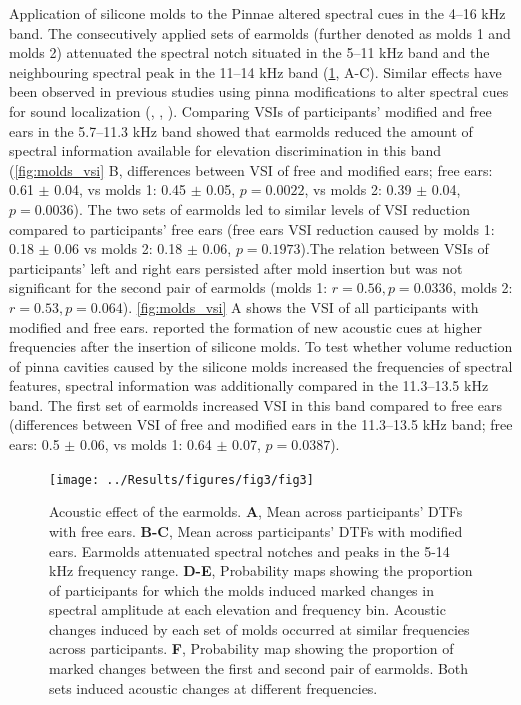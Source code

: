 Application of silicone molds to the Pinnae altered spectral cues in the 4–16 kHz band. The consecutively applied sets of earmolds (further denoted as molds 1 and molds 2) attenuated the spectral notch situated in the 5–11 kHz band and the neighbouring spectral peak in the 11–14 kHz band (\cref{fig:spectral_change}, A-C). Similar effects have been observed in previous studies using pinna modifications to alter spectral cues for sound localization (\citet{trapeau_fast_2016}, \citet{wanrooij_relearning_2005}, \citet{hofman_relearning_1998}). Comparing VSIs of participants' modified and free ears in the 5.7–11.3 kHz band showed that earmolds reduced the amount of spectral information available for elevation discrimination in this band (\cref{fig:molds_vsi} B, differences between VSI of free and modified ears; free ears: 0.61 $\pm$ 0.04, vs molds 1: 0.45 $\pm$ 0.05, $p = 0.0022$, vs molds 2: 0.39 $\pm$ 0.04, $p = 0.0036$). The two sets of earmolds led to similar levels of VSI reduction compared to participants' free ears (free ears VSI reduction caused by molds 1: 0.18 $\pm$ 0.06 vs molds 2: 0.18 $\pm$ 0.06, $p = 0.1973$).The relation between VSIs of participants' left and right ears persisted after mold insertion but was not significant for the second pair of earmolds (molds 1: $r = 0.56, p = 0.0336$, molds 2: $r = 0.53, p = 0.064$). \cref{fig:molds_vsi} A shows the VSI of all participants with modified and free ears. \citet{wanrooij_relearning_2005} reported the formation of new acoustic cues at higher frequencies after the insertion of silicone molds. To test whether volume reduction of pinna cavities caused by the silicone molds increased the frequencies of spectral features, spectral information was additionally compared in the 11.3–13.5 kHz band. The first set of earmolds increased VSI in this band compared to free ears (differences between VSI of free and modified ears in the 11.3–13.5 kHz band; free ears: 0.5 $\pm$ 0.06, vs molds 1: 0.64 $\pm$ 0.07, $p = 0.0387$).

\begin{figure}[h]
\centering
	\centerline{\texttt{[image: ../Results/figures/fig3/fig3]}}
	\caption{Acoustic effect of the earmolds. \textbf{A}, Mean across participants' DTFs with free ears. \textbf{B-C}, Mean across participants' DTFs with modified ears. Earmolds attenuated spectral notches and peaks in the 5-14 kHz frequency range. \textbf{D-E}, Probability maps showing the proportion of participants for which the molds induced marked changes in spectral amplitude at each elevation and frequency bin. Acoustic changes induced by each set of molds occurred at similar frequencies across participants. \textbf{F}, Probability map showing the proportion of marked changes between the first and second pair of earmolds. Both sets induced acoustic changes at different frequencies.}
        \label{fig:spectral_change}
\end{figure}


